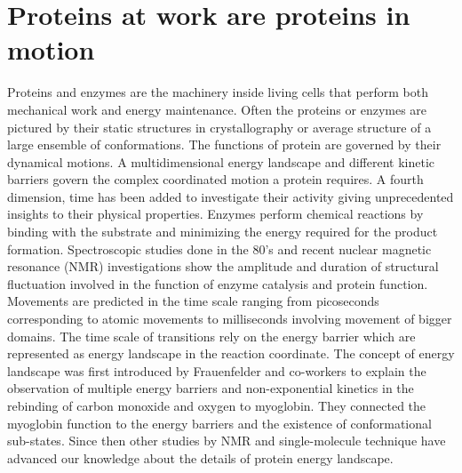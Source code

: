 \section{Proteins at work are  proteins in motion}
Proteins and enzymes are the machinery inside living cells that perform both mechanical work and energy maintenance.
Often the proteins or enzymes are pictured by their static structures in crystallography or average structure of a large ensemble of conformations.
The functions of protein are governed by their dynamical motions.
A multidimensional energy landscape and different kinetic barriers govern the complex coordinated motion a protein requires.
A fourth dimension, time has been added to investigate their activity giving unprecedented insights to their physical properties.
Enzymes perform chemical reactions by binding with the substrate and minimizing the energy required for the product formation.
Spectroscopic studies done in the 80's and recent nuclear magnetic resonance (NMR) investigations show the amplitude and duration of structural fluctuation involved in the function of enzyme catalysis and protein function.
Movements are predicted in the time scale ranging from picoseconds corresponding to atomic movements to milliseconds involving movement of bigger domains.\cite{henzler-wildman2007dynamic,frauenfelder1991the}
The time scale of transitions rely on the energy barrier which are represented as energy landscape in the reaction coordinate.
The concept of energy landscape was first introduced by Frauenfelder and co-workers\cite{frauenfelder1991the} to explain the observation of multiple energy barriers and non-exponential kinetics in the rebinding of carbon monoxide and oxygen to myoglobin.
They connected the myoglobin function to the energy barriers and the existence of conformational sub-states.
Since then other studies by NMR and single-molecule technique have advanced our knowledge about the details of protein energy landscape.


